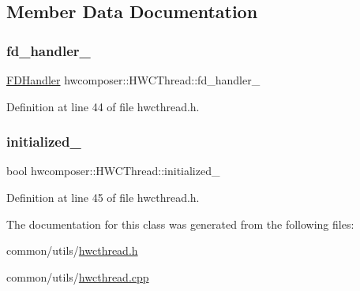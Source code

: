 \subsection{Member Data Documentation}
\mbox{\label{classhwcomposer_1_1HWCThread_a26ef5b90fd394e2002d903ffd2521faf}} 
\subsubsection{\texorpdfstring{fd\+\_\+handler\+\_\+}{fd\_handler\_}}
{\footnotesize\ttfamily \mbox{\hyperlink{classhwcomposer_1_1FDHandler}{F\+D\+Handler}} hwcomposer\+::\+H\+W\+C\+Thread\+::fd\+\_\+handler\+\_\+\hspace{0.3cm}{\ttfamily [protected]}}



Definition at line 44 of file hwcthread.\+h.

\mbox{\label{classhwcomposer_1_1HWCThread_a7461f5a7553b74324ad6744d532c731b}} 
\subsubsection{\texorpdfstring{initialized\+\_\+}{initialized\_}}
{\footnotesize\ttfamily bool hwcomposer\+::\+H\+W\+C\+Thread\+::initialized\+\_\+\hspace{0.3cm}{\ttfamily [protected]}}



Definition at line 45 of file hwcthread.\+h.



The documentation for this class was generated from the following files\+:\begin{DoxyCompactItemize}
\item 
common/utils/\mbox{\hyperlink{hwcthread_8h}{hwcthread.\+h}}\item 
common/utils/\mbox{\hyperlink{hwcthread_8cpp}{hwcthread.\+cpp}}\end{DoxyCompactItemize}
